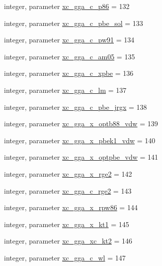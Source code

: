 \begin{DoxyCompactItemize}
integer, parameter \hyperlink{classlibxc__funcs__m_aedc020b070972d317e7c3eaa07d33b37}{xc\-\_\-gga\-\_\-c\-\_\-p86} = 132
\item 
integer, parameter \hyperlink{classlibxc__funcs__m_a44f75482ea324f5a50539ffdfb35b6f7}{xc\-\_\-gga\-\_\-c\-\_\-pbe\-\_\-sol} = 133
\item 
integer, parameter \hyperlink{classlibxc__funcs__m_af20bd6ced898ed4f4c011dad03298494}{xc\-\_\-gga\-\_\-c\-\_\-pw91} = 134
\item 
integer, parameter \hyperlink{classlibxc__funcs__m_a0fa2075d2bad4a98732325a0e3b66943}{xc\-\_\-gga\-\_\-c\-\_\-am05} = 135
\item 
integer, parameter \hyperlink{classlibxc__funcs__m_ab765f4ab5c988175ad09e9ab58433d68}{xc\-\_\-gga\-\_\-c\-\_\-xpbe} = 136
\item 
integer, parameter \hyperlink{classlibxc__funcs__m_a70e8a6af323a26bc3abd717ae8219ba4}{xc\-\_\-gga\-\_\-c\-\_\-lm} = 137
\item 
integer, parameter \hyperlink{classlibxc__funcs__m_af27116fb422c962bc6f7d5d11b11e908}{xc\-\_\-gga\-\_\-c\-\_\-pbe\-\_\-jrgx} = 138
\item 
integer, parameter \hyperlink{classlibxc__funcs__m_a3b3822519c43ac67a42c922e92671e68}{xc\-\_\-gga\-\_\-x\-\_\-optb88\-\_\-vdw} = 139
\item 
integer, parameter \hyperlink{classlibxc__funcs__m_a5d1a7fca680b5a2b5f5e53d2fd477bca}{xc\-\_\-gga\-\_\-x\-\_\-pbek1\-\_\-vdw} = 140
\item 
integer, parameter \hyperlink{classlibxc__funcs__m_abd63f747e9e042afa1b647a0d0bb6a70}{xc\-\_\-gga\-\_\-x\-\_\-optpbe\-\_\-vdw} = 141
\item 
integer, parameter \hyperlink{classlibxc__funcs__m_af8fcabebbf7f7ffab5a42a8e6ed8ebc9}{xc\-\_\-gga\-\_\-x\-\_\-rge2} = 142
\item 
integer, parameter \hyperlink{classlibxc__funcs__m_abcb3cbd06df71def9e61bd0d466231d1}{xc\-\_\-gga\-\_\-c\-\_\-rge2} = 143
\item 
integer, parameter \hyperlink{classlibxc__funcs__m_a87f00e75740ceb4a291ac4607b96b7e5}{xc\-\_\-gga\-\_\-x\-\_\-rpw86} = 144
\item 
integer, parameter \hyperlink{classlibxc__funcs__m_a7d2b0339715fb85378d235856fc9d357}{xc\-\_\-gga\-\_\-x\-\_\-kt1} = 145
\item 
integer, parameter \hyperlink{classlibxc__funcs__m_aca08bea09955d39fb14124b5a2415782}{xc\-\_\-gga\-\_\-xc\-\_\-kt2} = 146
\item 
integer, parameter \hyperlink{classlibxc__funcs__m_a2b3430b3b337d8c2cc56a47ff383c820}{xc\-\_\-gga\-\_\-c\-\_\-wl} = 147

\end{DoxyCompactItemize}
